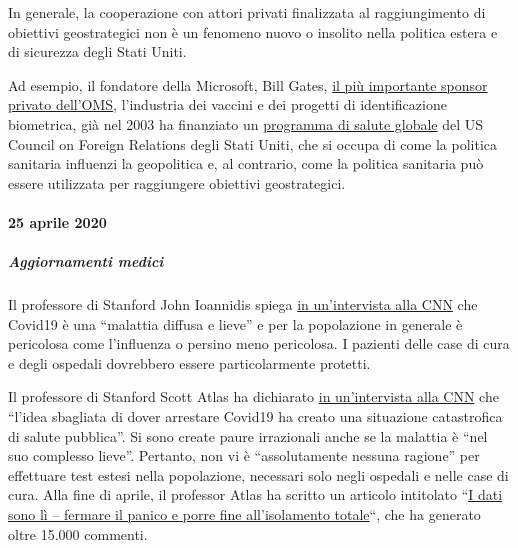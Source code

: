 In generale, la cooperazione con attori privati finalizzata al
raggiungimento di obiettivi geostrategici non è un fenomeno nuovo o
insolito nella politica estera e di sicurezza degli Stati Uniti.

Ad esempio, il fondatore della Microsoft, Bill Gates,
\href{https://www.youtube.com/watch?v=wQSYdAX_9JY}{il più importante
sponsor privato dell'OMS}, l'industria dei vaccini e dei progetti di
identificazione biometrica, già nel 2003 ha finanziato un
\href{https://www.cfr.org/news-releases/council-establishes-senior-fellowship-global-health-and-foreign-policy-grant-bill}{programma
di salute globale} del US Council on Foreign Relations degli Stati
Uniti, che si occupa di come la politica sanitaria influenzi la
geopolitica e, al contrario, come la politica sanitaria può essere
utilizzata per raggiungere obiettivi geostrategici.

\hypertarget{25-aprile-2020}{%
\paragraph{25 aprile 2020}\label{25-aprile-2020}}

\hypertarget{aggiornamenti-medici}{%
\subparagraph{\texorpdfstring{\textbf{Aggiornamenti
medici}}{Aggiornamenti medici}}\label{aggiornamenti-medici}}

Il professore di Stanford John Ioannidis spiega
\href{https://twitter.com/cnn/status/1256579248342564865}{in
un'intervista alla CNN} che Covid19 è una ``malattia diffusa e lieve'' e
per la popolazione in generale è pericolosa come l'influenza o persino
meno pericolosa. I pazienti delle case di cura e degli ospedali
dovrebbero essere particolarmente protetti.

Il professore di Stanford Scott Atlas ha dichiarato
\href{https://www.facebook.com/cnn/posts/10160799274796509}{in
un'intervista alla CNN} che ``l'idea sbagliata di dover arrestare
Covid19 ha creato una situazione catastrofica di salute pubblica''. Si
sono create paure irrazionali anche se la malattia è ``nel suo complesso
lieve''. Pertanto, non vi è ``assolutamente nessuna ragione'' per
effettuare test estesi nella popolazione, necessari solo negli ospedali
e nelle case di cura. Alla fine di aprile, il professor Atlas ha scritto
un articolo intitolato
``\href{https://thehill.com/opinion/healthcare/494034-the-data-are-in-stop-the-panic-and-end-the-total-isolation}{I
dati sono lì -- fermare il panico e porre fine all'isolamento totale}``,
che ha generato oltre 15.000 commenti.

